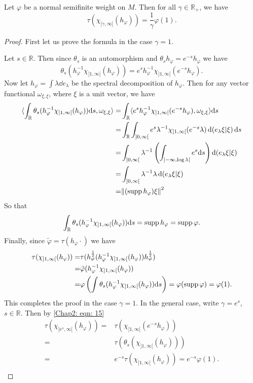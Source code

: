 \begin{lemma}\label{Chap2: Lemma: 5}
    Let $\varphi$ be a normal semifinite weight on $M$. Then for all $\gamma\in \mathbb{R}_+$, we have 
    \[
      \tau(\chi_{]\gamma,\infty[}(h_\varphi))=\frac{1}{\gamma}\varphi(1).
    \]
\end{lemma}
\begin{proof}
    First let us prove the formula in the case $\gamma=1$.\par 
Let $s\in \mathbb{R}$. Then since $\theta_s$ is an automorphism and $\theta_sh_\varphi=e^{-s}h_\varphi$ we have
\[
    \theta_s(h_\varphi^{-1}\chi_{]1,\infty[}(h_\varphi))=e^sh_\varphi^{-1}\chi_{]1,\infty[}(e^{-s}h_\varphi).
\]
Now let $h_\varphi=\int\lambda\dd e_\lambda$ be the spectral decomposition of $h_\varphi$. Then for any vector functional $\omega_{\xi,\xi}$, where $\xi$ is a unit vector, we have 
\[
    \begin{split}
        \langle\int_\mathbb{R}\theta_s(h_\varphi^{-1}\chi_{]1,\infty[}(h_\varphi))\dd s,\omega_{\xi,\xi}\rangle=&\int_\mathbb{R}\langle e^sh_\varphi^{-1}\chi_{]1,\infty[}(e^{-s}h_\varphi),\omega_{\xi,\xi}\rangle\dd s\\ 
        =&\int_\mathbb{R}\int_{]0,\infty[}e^s\lambda^{-1}\chi_{]1,\infty[}(e^{-s}\lambda)\dd (e_\lambda \xi|\xi)\dd s\\
        =&\int_{]0,\infty[}\lambda^{-1}\left( \int_{]-\infty,\log \lambda[}e^s\dd s \right)\dd (e_\lambda \xi|\xi)\\
        =&\int_{]0,\infty[}\lambda^{-1}\lambda\dd (e_\lambda \xi|\xi)\\
        =&\norm{(\operatorname{supp} h_\varphi)\xi}^2
    \end{split}
\]
So that
\[
    \int_\mathbb{R}\theta_s(h_\varphi^{-1}\chi_{]1,\infty[}(h_\varphi))\dd s=\operatorname{supp} h_\varphi=\operatorname{supp} \varphi.
\]
Finally, since $\tilde{\varphi}=\tau(h_\varphi\cdot)$ we have 
\[
\begin{split}
    \tau(\chi_{]1,\infty[}(h_\varphi))=&\tau(h_\varphi^\frac{1}{2}(h_\varphi^{-1}\chi_{]1,\infty[}(h_\varphi))h_\varphi^\frac{1}{2})\\
    =&\tilde{\varphi}(h_\varphi^{-1}\chi_{]1,\infty[}(h_\varphi))\\
    =&\varphi\left( \int \theta_s(h_\varphi^{-1}\chi_{]1,\infty[}(h_\varphi))\dd s \right)=\varphi(\operatorname{supp} \varphi)=\varphi(1).
\end{split}
\]
This completes the proof in the case $\gamma=1$. In the general case, write $\gamma=e^s$, $s\in \mathbb{R}$. Then by \eqref{Chap2: eqn: 15} 
\[
    \begin{split}
        \tau(\chi_{]e^s,\infty[}(h_\varphi))=&\tau(\chi_{]1,\infty[}(e^{-s}h_\varphi))\\
        =&\tau(\theta_s(\chi_{]1,\infty[}(h_\varphi)))\\
        =&e^{-s}\tau(\chi_{]1,\infty[}(h_\varphi))=e^{-s}\varphi(1).\\
    \end{split}  
\]
\end{proof}
